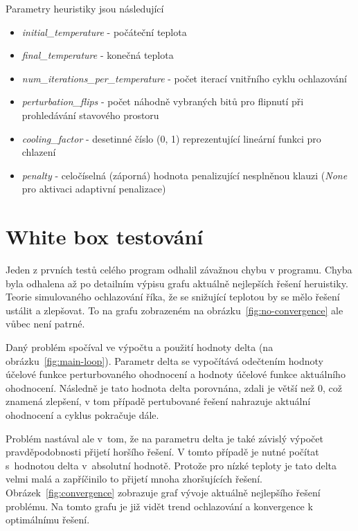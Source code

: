 \documentclass[twoside,twocolumn]{article}
\begin{document}
    Parametry heuristiky jsou následující

    \begin{itemize}
        \item \emph{initial\_temperature} - počáteční teplota
        \item \emph{final\_temperature} - konečná teplota
        \item \emph{num\_iterations\_per\_temperature} - počet iterací vnitřního cyklu ochlazování
        \item \emph{perturbation\_flips} - počet náhodně vybraných bitů pro flipnutí při prohledávání stavového prostoru
        \item \emph{cooling\_factor} - desetinné číslo (0, 1) reprezentující lineární funkci pro chlazení
        \item \emph{penalty} - celočíselná (záporná) hodnota penalizující nesplněnou klauzi (\emph{None} pro aktivaci adaptivní penalizace)
    \end{itemize}


    \section{White box testování}

    Jeden z prvních testů celého program odhalil závažnou chybu v programu.
    Chyba byla odhalena až po detailním výpisu grafu aktuálně nejlepších řešení heruistiky.
    Teorie simulovaného ochlazování říka, že se snižující teplotou by se mělo řešení ustálit a zlepšovat.
    To na grafu zobrazeném na obrázku~\ref{fig:no-convergence} ale vůbec není patrné.

    Daný problém spočíval ve výpočtu a použití hodnoty delta (na obrázku~\ref{fig:main-loop}).
    Parametr delta se vypočítává odečtením hodnoty účelové funkce perturbovaného ohodnocení a hodnoty účelové funkce
    aktuálního ohodnocení.
    Následně je tato hodnota delta porovnána, zdali je větší než 0, což znamená zlepšení, v tom případě pertubované řešení
    nahrazuje aktuální ohodnocení a cyklus pokračuje dále.

    Problém nastával ale v~tom, že na parametru delta je také závislý výpočet pravděpodobnosti přijetí horšího řešení.
    V tomto případě je nutné počítat s~hodnotou delta v~absolutní hodnotě.
    Protože pro nízké teploty je tato delta velmi malá a zapříčinilo to přijetí mnoha zhoršujících řešení.
    Obrázek~\ref{fig:convergence} zobrazuje graf vývoje aktuálně nejlepšího řešení problému.
    Na tomto grafu je již vidět trend ochlazování a konvergence k optimálnímu řešení.
\end{document}
